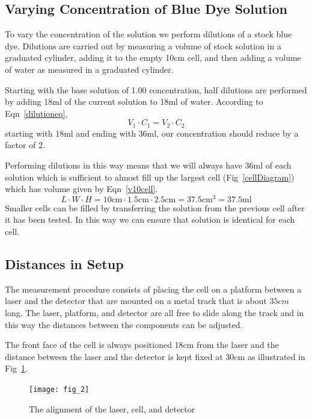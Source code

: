 \documentclass[aps,prl,reprint,groupedaddress,amsmath,amssymb,aps]{revtex4-1}
\begin{document}
	\subsection{Varying Concentration of Blue Dye Solution}
	To vary the concentration of the solution we perform dilutions of a stock blue dye. Dilutions are carried out by measuring a volume of stock solution in a graduated cylinder, adding it to the empty 10cm cell, and then adding a volume of water as measured in a graduated cylinder.
	
	Starting with the base solution of 1.00 concentration, half dilutions are performed by adding 18ml of the current solution to 18ml of water. According to Eqn~\ref{dilutioneq},
	\begin{equation}
		\label{dilutioneq}
		V_1 \cdot C_1 = V_2 \cdot C_2
	\end{equation}
	starting with 18ml and ending with 36ml, our concentration should reduce by a factor of 2. 
	
	Performing dilutions in this way means that we will always have 36ml of each solution which is sufficient to almost fill up the largest cell (Fig~\ref{cellDiagram}) which has volume given by Eqn~\ref{v10cell}.
	\begin{equation}
		\label{v10cell}
		L \cdot W \cdot H=10\mathrm{cm}\cdot 1.5\mathrm{cm}\cdot 2.5\mathrm{cm}=37.5\mathrm{cm}^3=37.5\mathrm{ml}
	\end{equation}
	Smaller cells can be filled by transferring the solution from the previous cell after it has been tested. In this way we can ensure that solution is identical for each cell.
	
	\subsection{Distances in Setup}
	The measurement procedure consists of placing the cell on a platform between a laser and the detector that are mounted on a metal track that is about $35cm$ long. The laser, platform, and detector are all free to slide along the track and in this way the distances between the components can be adjusted.
	
	The front face of the cell is always positioned 18cm from the laser and the distance between the laser and the detector is kept fixed at 30cm as illustrated in Fig~\ref{setup}.
	\begin{figure}
		\texttt{[image: fig\_2]}
		\caption{\label{setup}The alignment of the laser, cell, and detector}
	\end{figure}
\end{document}
